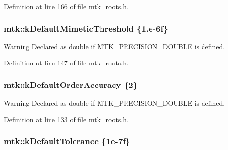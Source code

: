 Definition at line \hyperlink{mtk__roots_8h_source_l00166}{166} of file \hyperlink{mtk__roots_8h_source}{mtk\-\_\-roots.\-h}.

\hypertarget{group__c01-roots_ga35718d949bdc81a08a9cc8ebbe3478a2}{
\subsubsection[{k\-Default\-Mimetic\-Threshold}]{\setlength{\rightskip}{0pt plus 5cm}mtk\-::k\-Default\-Mimetic\-Threshold \{1.e-\/6f\}}}\label{group__c01-roots_ga35718d949bdc81a08a9cc8ebbe3478a2}
\begin{DoxyWarning}{Warning}
Declared as double if M\-T\-K\-\_\-\-P\-R\-E\-C\-I\-S\-I\-O\-N\-\_\-\-D\-O\-U\-B\-L\-E is defined. 
\end{DoxyWarning}


Definition at line \hyperlink{mtk__roots_8h_source_l00147}{147} of file \hyperlink{mtk__roots_8h_source}{mtk\-\_\-roots.\-h}.

\hypertarget{group__c01-roots_ga0d95560098eb36420511103637b6952f}{
\subsubsection[{k\-Default\-Order\-Accuracy}]{\setlength{\rightskip}{0pt plus 5cm}mtk\-::k\-Default\-Order\-Accuracy \{2\}}}\label{group__c01-roots_ga0d95560098eb36420511103637b6952f}
\begin{DoxyWarning}{Warning}
Declared as double if M\-T\-K\-\_\-\-P\-R\-E\-C\-I\-S\-I\-O\-N\-\_\-\-D\-O\-U\-B\-L\-E is defined. 
\end{DoxyWarning}


Definition at line \hyperlink{mtk__roots_8h_source_l00133}{133} of file \hyperlink{mtk__roots_8h_source}{mtk\-\_\-roots.\-h}.

\hypertarget{group__c01-roots_gae914b125d81d1b97e0aee7bbc7739786}{
\subsubsection[{k\-Default\-Tolerance}]{\setlength{\rightskip}{0pt plus 5cm}mtk\-::k\-Default\-Tolerance \{1e-\/7f\}}}\label{group__c01-roots_gae914b125d81d1b97e0aee7bbc7739786}


